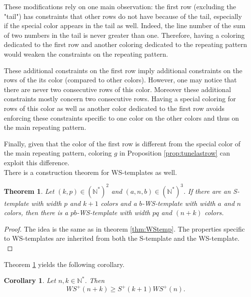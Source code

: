 \documentclass{article}
\newtheorem{theorem}[definition]{Theorem}
\newtheorem{computational theorem}[definition]{Computational Theorem}
\newtheorem{corollary}[definition]{Corollary}
\newcommand{\WS}{\mathit{WS}}
\begin{document}
\par
These modifications rely on one main observation: the first row (excluding the "tail") has constraints that other rows do not 
have because of the tail, especially if the special color appears in the tail as well. Indeed, the line number of the
sum of two numbers in the tail is never greater than one. Therefore, having a coloring dedicated to 
the first row and another coloring dedicated to the repeating pattern would weaken the constraints on the repeating pattern. 

\par
These  additional constraints on the first row imply  additional constraints on the rows of the its color (compared to other 
colors). However, one may notice that there are never two consecutive rows of this color. Moreover these  additional constraints 
mostly concern two consecutive rows. Having a special coloring for rows of this color as well as another color dedicated to the 
first row avoids enforcing these constraints specific to one color on the other colors and thus on the main repeating pattern.

\par
Finally, given that the color of the first row is different from the special color of the main repeating pattern, coloring \(g\) in
Proposition \ref{prop:tunelastrow} can exploit this difference. \\

There is a construction theorem for WS-templates as well.

\begin{theorem}
\label{thm:compWStemp}
Let \((k,p) \in (\mathbb{N}^*)^2\) and \((a, n, b) \in (\mathbb{N}^*)^3\). If there are an S-template with width
\(p\) and \(k+1\) colors and a \(b\)-WS-template with width \(a\) and \(n\) colors, then there is a \(pb\)-WS-template
with width \(pq\) and \((n+k)\) colors.
\end{theorem}

\begin{proof}
The idea is the same as in theorem \ref{thm:WStemp}. The properties specific to WS-templates are inherited 
from both the S-template and the WS-template. \\
\end{proof}

Theorem \ref{thm:compWStemp} yields the following corollary.

\begin{corollary}
Let \(n, k \in \mathbb{N}^*\). Then
\[
\WS^+(n+k) \geqslant S^+(k+1) \WS^+(n).
\]
\end{corollary}
\end{document}
